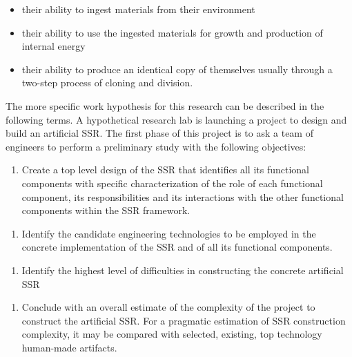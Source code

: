 \bigskip

\begin{itemize}
\item their ability to ingest materials from their environment
\item their ability to use the ingested materials for growth and
production of internal energy
\item their ability to produce an identical copy of themselves usually
through a two-step process of cloning and division.
\end{itemize}
The more specific work hypothesis for this research can be described in
the following terms. A hypothetical research lab is launching a project
to design and build an artificial SSR. The first phase of this project
is to ask a team of engineers to perform a preliminary study with the
following objectives:


\bigskip

\begin{enumerate}
\item  Create a top level design of the SSR that identifies all its
functional components with specific characterization of the role of
each functional component, its responsibilities and its interactions
with the other functional components within the SSR framework.
\end{enumerate}

\bigskip

\begin{enumerate}
\item  Identify the candidate engineering technologies to be employed in
the concrete implementation of the SSR and of all its functional
components.
\end{enumerate}

\bigskip

\begin{enumerate}
\item  Identify the highest level of difficulties in constructing the
concrete artificial SSR
\end{enumerate}

\bigskip

\begin{enumerate}
\item  Conclude with an overall estimate of the complexity of the
project to construct the artificial SSR. For a pragmatic estimation of
SSR construction complexity, it may be compared with selected,
existing, top technology human-made artifacts.
\end{enumerate}
